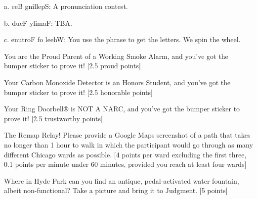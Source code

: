 \documentclass{book}
\begin{document}
\begin{list}{}{}
a.  eeB gnillepS: A pronunciation contest.

b. dueF ylimaF: TBA.

c. enutroF fo leehW: You use the phrase to get the letters. We spin the wheel.
\item You are the Proud Parent of a Working Smoke Alarm, and you've got the bumper sticker to prove it! [2.5 proud points]
\item Your Carbon Monoxide Detector is an Honors Student, and you've got the bumper sticker to prove it! [2.5 honorable points]
\item Your Ring Doorbell® is NOT A NARC, and you've got the bumper sticker to prove it! [2.5 trustworthy points]
\item The Remap Relay! Please provide a Google Maps screenshot of a path that takes no longer than 1 hour to walk in which the participant would go through as many different Chicago wards as possible. [4 points per ward excluding the first three, 0.1 points per minute under 60 minutes, provided you reach at least four wards]
\item Where in Hyde Park can you find an antique, pedal-activated water fountain, albeit non-functional? Take a picture and bring it to Judgment. [5 points]


\end{list}
\end{document}
